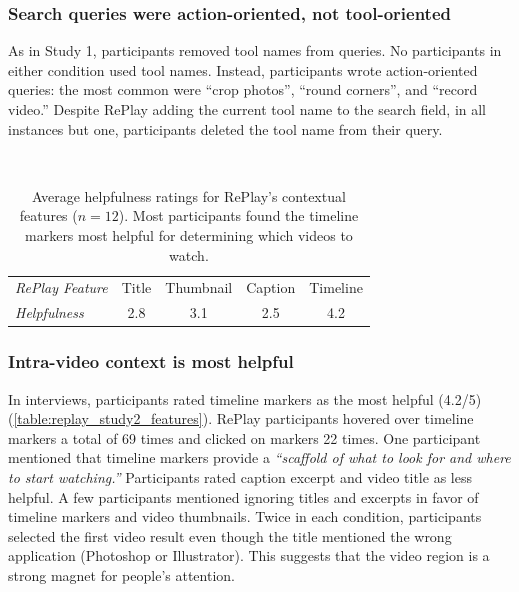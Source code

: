 
\subsubsection{Search queries were action-oriented, not tool-oriented}
As in Study 1, participants removed tool names from queries. No participants in either condition used tool names. Instead, participants wrote action-oriented queries: the most common were ``crop photos'', ``round corners'', and ``record video.'' Despite RePlay adding the current tool name to the search field, in all instances but one, participants deleted the tool name from their query.

\begin{table}[t]
\centering
\caption{Average helpfulness ratings for RePlay's contextual features ($n\!=\!12$). Most participants found the timeline markers most helpful for determining which videos to watch.}~\label{table:replay_study2_features}
\begin{tabular}{lllll}
\textit{RePlay Feature} & Title                   & Thumbnail               & Caption                 & Timeline                \\ 
\textit{Helpfulness}    & \multicolumn{1}{c}{2.8} & \multicolumn{1}{c}{3.1} & \multicolumn{1}{c}{2.5} & \multicolumn{1}{c}{4.2}
\end{tabular}
\end{table}

\subsubsection{Intra-video context is most helpful}
In interviews, participants rated timeline markers as the most helpful (4.2/5) (\autoref{table:replay_study2_features}). RePlay participants hovered over timeline markers a total of 69 times and clicked on markers 22 times. One participant mentioned that timeline markers provide a \textit{``scaffold of what to look for and where to start watching.''} Participants rated caption excerpt and video title as less helpful. A few participants mentioned ignoring titles and excerpts in favor of timeline markers and video thumbnails. Twice in each condition, participants selected the first video result even though the title mentioned the wrong application (Photoshop or Illustrator). This suggests that the video region is a strong magnet for people's attention.


